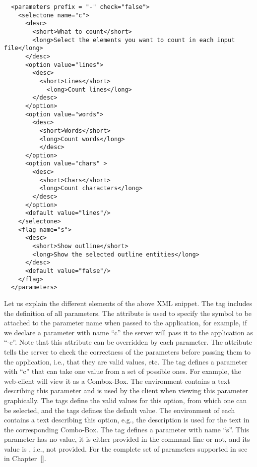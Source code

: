 \medskip
\begin{lstlisting}
  <parameters prefix = "-" check="false">
    <selectone name="c">
      <desc>
        <short>What to count</short>
        <long>Select the elements you want to count in each input file</long>
      </desc>
      <option value="lines">
        <desc>
          <short>Lines</short>
            <long>Count lines</long>
        </desc>
      </option>
      <option value="words">
        <desc>
          <short>Words</short>
          <long>Count words</long>
          </desc>
      </option>
      <option value="chars" >
        <desc>
          <short>Chars</short>
          <long>Count characters</long>
        </desc>
      </option>
      <default value="lines"/>
    </selectone>
    <flag name="s">
      <desc>
        <short>Show outline</short>
        <long>Show the selected outline entities</long>
      </desc>
      <default value="false"/>
    </flag>
  </parameters>
\end{lstlisting}

\medskip
\noindent
Let us explain the different elements of the above XML snippet. 
%
The tag  includes the definition of all
parameters. The attribute  is used to specify the symbol
to be attached to the parameter name when passed to the application,
for example, if we declare a parameter with name ``c'' the server will
pass it to the application as ``-c''. Note that this attribute can be
overridden by each parameter.
%
The attribute  tells the server to check the correctness of
the parameters before passing them to the application, i.e., that they
are valid values, etc.
%
The tag  defines a parameter with  ``c'' that
can take one value from a set of possible ones. For example, the
web-client will view it as a Combox-Box.
%
The  environment contains a text describing this parameter
and is used by the client when viewing this parameter graphically.
%
The  tags define the valid values for this option, from
which one can be selected, and the  tags defines the
default value.  The  environment of each 
contains a text describing this option, e.g., the 
description is used for the text in the corresponding Combo-Box.
%
The tag  defines a parameter with name ``s''. This parameter
has no value, it is either provided in the command-line or not, and
its  value is , i.e., not provided. For the
complete set of parameters supported in \ei see
 in Chapter~\ref{}.

